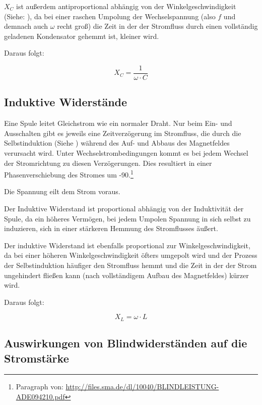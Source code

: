 $X_C$ ist außerdem antiproportional abhängig von der Winkelgeschwindigkeit (Siehe: ), da bei einer raschen Umpolung der Wechselspannung (also $f$ und demnach auch $\omega$ recht groß) die Zeit in der der Stromfluss durch einen vollständig geladenen Kondensator gehemmt ist, kleiner wird.

Daraus folgt:

\begin{equation}	\label{eq:KapazitiverWiderstand}
	X_C = \frac{1}{\omega \cdot C}
\end{equation}


\subsection{Induktive Widerstände}		\label{subsec:InduktiverWiderstand}

Eine Spule leitet Gleichstrom wie ein normaler Draht. Nur beim Ein- und Ausschalten gibt es jeweils eine Zeitverzögerung im Stromfluss, die durch die Selbstinduktion (Siehe ) während des Auf- und Abbaus des Magnetfeldes verursacht wird. Unter Wechselstrombedingungen kommt es bei jedem Wechsel der Stromrichtung zu diesen Verzögerungen. Dies resultiert in einer Phasenverschiebung des Stromes um -90\degree .\footnote{Paragraph von: \url{http://files.sma.de/dl/10040/BLINDLEISTUNG-ADE094210.pdf}}

\glqq Die Spannung eilt dem Strom voraus.\grqq

\vspace{11pt}

Der \glqq Induktive Widerstand\grqq{} ist proportional abhängig von der Induktivität der Spule, da ein höheres Vermögen, bei jedem Umpolen Spannung in sich selbst zu induzieren, sich in einer stärkeren Hemmung des Stromflusses äußert.

Der induktive Widerstand ist ebenfalls proportional zur Winkelgeschwindigkeit, da bei einer höheren Winkelgeschwindigkeit öfters umgepolt wird und der Prozess der Selbstinduktion häufiger den Stromfluss hemmt und die Zeit in der der Strom ungehindert fließen kann (nach vollständigem Aufbau des Magnetfeldes) kürzer wird.

Daraus folgt:

\begin{equation}	\label{eq:InduktiverWiderstand}
	X_L = \omega \cdot  L
\end{equation}


\subsection{Auswirkungen von Blindwiderständen auf die Stromstärke} \label{subsec:AuswirkungenWiderstand}

